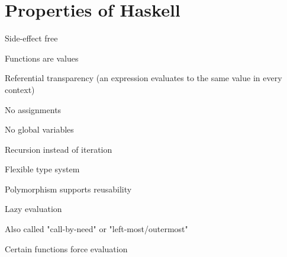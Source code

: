 \section{Properties of Haskell}
\enumstart
	\item Side-effect free
	\item Functions are values
	\item Referential transparency (an expression evaluates to the same value in every context)
	\enumstart
		\item No assignments
		\item No global variables
	\enumend
	\item Recursion instead of iteration
	\item Flexible type system
	\enumstart
		\item Polymorphism supports reusability
	\enumend
	\item Lazy evaluation
	\enumstart
		\item Also called "call-by-need" or "left-most/outermost"
		\item Certain functions force evaluation
	\enumend
\enumend
